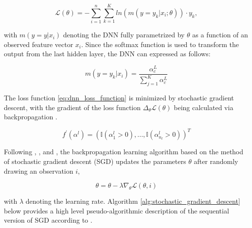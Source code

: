 \begin{equation}
    \mathscr{L} (\theta) = - \sum_{i=1}^{n} \sum_{ k=1 }^{K}  ln( m(y=y_{k} | x_{i}; \theta))  \cdot y_{k},
    \label{eq:dnn_loss_function}
\end{equation}

with $ m(y=y| x_{i}) $ denoting the DNN fully parametrized by $ \theta $  as a function of an observed feature vector $x_{i}$. 
Since the softmax function \cite{dixon2015annMarketPrediction} is used to transform the output from the last hidden layer,
the DNN can expressed as follows:

\begin{equation}
    m( y=y_{k} | x_{i} ) =  \frac{ \alpha_{c}^{L} }{ \sum_{j=1}^{K} \alpha_{c}^{L} }
\end{equation}

The loss function \ref{eq:dnn_loss_function} is minimized
by stochastic gradient descent, with the gradient of the loss function $\Delta_{\theta} \mathscr{L} (\theta)$
being calculated via backpropagation \cite{krauss2016arbitrageSandP}.


\begin{equation}
    f^{'}(\alpha^{l}) = ( \mathbb{I}(\alpha^{l}_{1} > 0), ..., \mathbb{I}(\alpha^{l}_{ n_{l} } > 0) )^{T}
\end{equation}

Following \cite{rojas1996neuralNetworks}, \cite{ruder2016gradientDescent}, and \cite{dixon2015annMarketPrediction},
the backpropagation learning algorithm based on the method of stochastic gradient descent (SGD) updates 
the parameters $ \theta $ after randomly drawing an observation $i$,

\begin{equation}
    \theta = \theta - \lambda \nabla_{ \theta } \mathscr{L}( \theta, i )
\end{equation}

with $\lambda$ denoting the learning rate.
Algorithm \ref{alg:stochastic_gradient_descent} below provides a high level pseudo-algorithmic description of the sequential version of
SGD according to \cite{dixon2015annMarketPrediction}.


